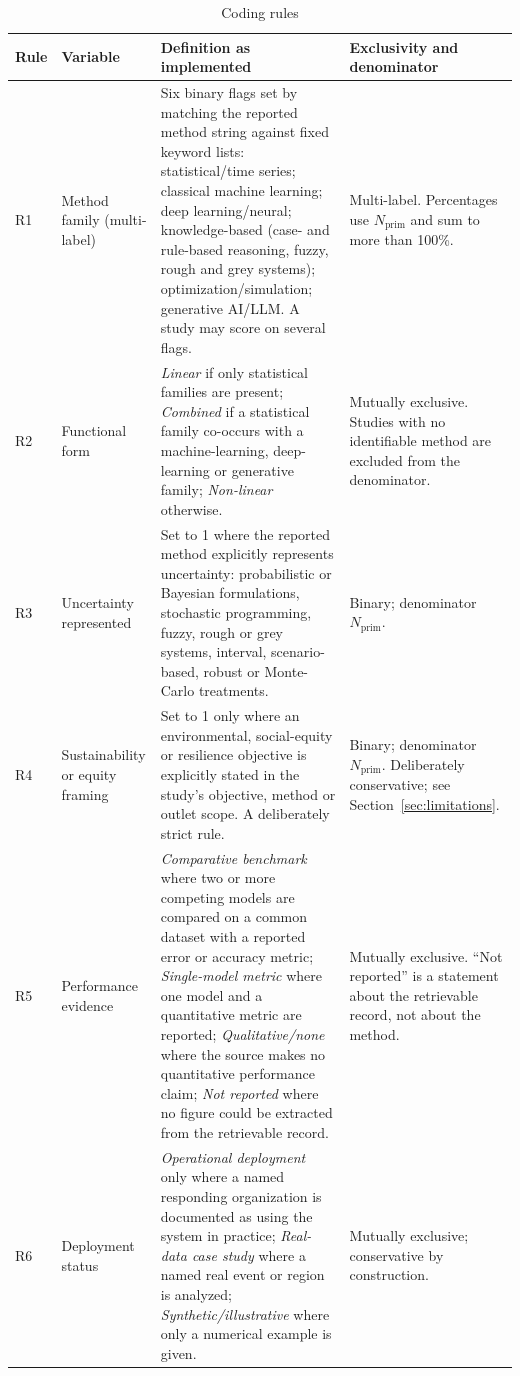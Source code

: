 \begin{table}[htbp!]
\centering
\scriptsize
\tiny
\caption{Coding rules}
\label{tab:coding_rules}
\begin{tabular}{@{}p{0.6cm}p{2.6cm}p{7.6cm}p{3.4cm}@{}}
\toprule
\textbf{Rule} & \textbf{Variable} & \textbf{Definition as implemented} & \textbf{Exclusivity and denominator} \\
\midrule
R1 & Method family (multi-label) & Six binary flags set by matching the reported method string against fixed keyword lists: statistical/time series; classical machine learning; deep learning/neural; knowledge-based (case- and rule-based reasoning, fuzzy, rough and grey systems); optimization/simulation; generative AI/LLM. A study may score on several flags. & Multi-label. Percentages use $N_{\mathrm{prim}}$ and sum to more than 100\%. \\[3pt]
R2 & Functional form & \emph{Linear} if only statistical families are present; \emph{Combined} if a statistical family co-occurs with a machine-learning, deep-learning or generative family; \emph{Non-linear} otherwise. & Mutually exclusive. Studies with no identifiable method are excluded from the denominator. \\[3pt]
R3 & Uncertainty represented & Set to 1 where the reported method explicitly represents uncertainty: probabilistic or Bayesian formulations, stochastic programming, fuzzy, rough or grey systems, interval, scenario-based, robust or Monte-Carlo treatments. & Binary; denominator $N_{\mathrm{prim}}$. \\[3pt]
R4 & Sustainability or equity framing & Set to 1 only where an environmental, social-equity or resilience objective is explicitly stated in the study's objective, method or outlet scope. A deliberately strict rule. & Binary; denominator $N_{\mathrm{prim}}$. Deliberately conservative; see Section~\ref{sec:limitations}. \\[3pt]
R5 & Performance evidence & \emph{Comparative benchmark} where two or more competing models are compared on a common dataset with a reported error or accuracy metric; \emph{Single-model metric} where one model and a quantitative metric are reported; \emph{Qualitative/none} where the source makes no quantitative performance claim; \emph{Not reported} where no figure could be extracted from the retrievable record. & Mutually exclusive. ``Not reported'' is a statement about the retrievable record, not about the method. \\[3pt]
R6 & Deployment status & \emph{Operational deployment} only where a named responding organization is documented as using the system in practice; \emph{Real-data case study} where a named real event or region is analyzed; \emph{Synthetic/illustrative} where only a numerical example is given. & Mutually exclusive; conservative by construction. \\[3pt]
\bottomrule
\end{tabular}
\normalsize
\end{table}
